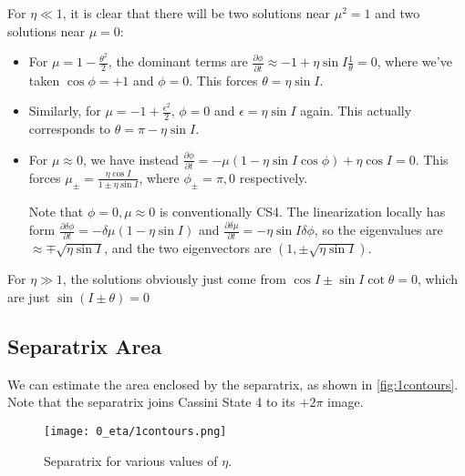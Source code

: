 \documentclass[11pt,
        usenames, %
        dvipsnames %
    ]{article}
\newcommand*{\pd}[2]{\frac{\partial#1}{\partial#2}}
\newcommand*{\p}[1]{\left(#1\right)}
\begin{document}
For $\eta \ll 1$, it is clear that there will be two solutions near $\mu^2 = 1$
and two solutions near $\mu = 0$:
\begin{itemize}
    \item For $\mu = 1 - \frac{\theta^2}{2}$, the dominant terms are
        $\pd{\phi}{t} \approx -1 + \eta \sin I \frac{1}{\theta} = 0$,
        where we've taken $\cos \phi = +1$ and $\phi = 0$. This forces $\theta
        = \eta \sin I$.

    \item Similarly, for $\mu = -1 + \frac{\epsilon^2}{2}$, $\phi = 0$ and
        $\epsilon = \eta \sin I$ again. This actually corresponds to $\theta =
        \pi - \eta \sin I$.

    \item For $\mu \approx 0$, we have instead $\pd{\phi}{t} = -\mu\p{1 - \eta
        \sin I \cos \phi} + \eta \cos I = 0$. This forces $\mu_\pm = \frac{\eta
        \cos I}{1 \pm \eta \sin I}$, where $\phi_{\pm} = \pi, 0$ respectively.

        Note that $\phi = 0, \mu \approx 0$ is conventionally CS4. The
        linearization locally has form $\pd{\delta \phi}{t} = -\delta \mu\p{1 -
        \eta \sin I}$ and $\pd{\delta \mu}{t} = -\eta \sin I \delta \phi$, so
        the eigenvalues are $\approx \mp \sqrt{\eta \sin I}$, and the two
        eigenvectors are $\p{1, \pm \sqrt{\eta \sin I}}$.
\end{itemize}

For $\eta \gg 1$, the solutions obviously just come from $\cos I \pm \sin I \cot
\theta = 0$, which are just $\sin (I \pm \theta) = 0$

\subsection{Separatrix Area}\label{ss:sep_area}

We can estimate the area enclosed by the separatrix, as shown in
\autoref{fig:1contours}. Note that the separatrix joins Cassini State 4 to its
$+ 2\pi$ image.
\begin{figure}[t]
    \centering
    \texttt{[image: 0\_eta/1contours.png]}
    \caption{Separatrix for various values of $\eta$.}\label{fig:1contours}
\end{figure}
\end{document}
